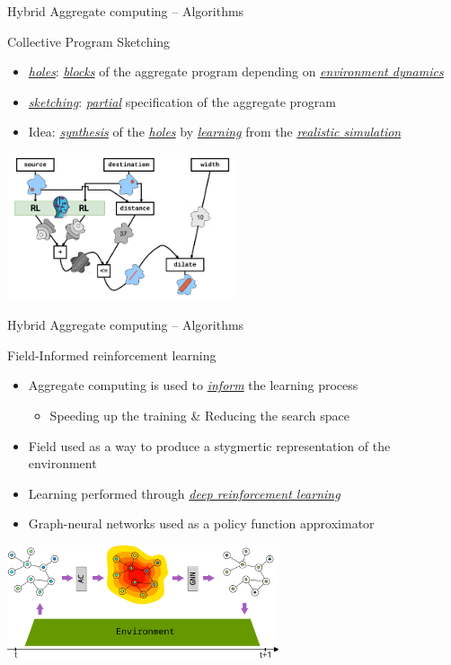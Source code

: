 \documentclass[presentation, 9pt]{beamer}\mode<presentation>{\usetheme{AMSBolognaFC}}
\begin{document}
\begin{frame}{Hybrid Aggregate computing -- Algorithms}
  \begin{exampleblock}{Collective Program Sketching~\cite{DBLP:conf/coordination/AguzziCV22}}
    \begin{itemize}
      \item \emph{\underline{holes}}: \emph{\underline{blocks}} of the aggregate program depending on \emph{\underline{environment dynamics}}
      \item \emph{\underline{sketching}}: \emph{\underline{partial}} specification of the aggregate program
      \item Idea: \emph{\underline{synthesis}} of the \emph{\underline{holes}} by \emph{\underline{learning}} from the \emph{\underline{realistic simulation}}
    \end{itemize}
    \begin{center}
    \includegraphics[width=0.5\textwidth]{img/synthesis-3.png}
    \end{center}
  \end{exampleblock}
\end{frame}
\begin{frame}{Hybrid Aggregate computing -- Algorithms}
  
\begin{exampleblock}{Field-Informed reinforcement learning~\cite{acgnn}}
  \begin{itemize}
    \item Aggregate computing is used to \emph{\underline{inform}} the learning process
    \begin{itemize}
      \item Speeding up the training \& Reducing the search space
    \end{itemize} 
    \item Field used as a way to produce a stygmertic representation of the environment
    \item Learning performed through \emph{\underline{deep reinforcement learning}}
    \item Graph-neural networks used as a policy function approximator
  \end{itemize}
\centering
  \includegraphics[width=0.6\textwidth]{img/architecture.pdf}
\end{exampleblock}
\end{frame}
\end{document}
